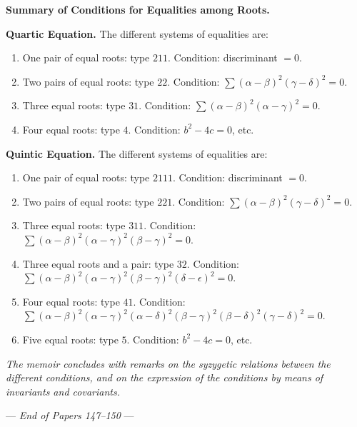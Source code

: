 \documentclass[11pt,a4paper]{article}
\begin{document}
\newpage
\begin{center}
\textbf{Summary of Conditions for Equalities among Roots.}
\end{center}

\textbf{Quartic Equation.} The different systems of equalities are:
\begin{enumerate}[label=(\roman*)]
\item One pair of equal roots: type $211$. Condition: discriminant $= 0$.
\item Two pairs of equal roots: type $22$. Condition:
  $\sum (\alpha - \beta)^2 (\gamma - \delta)^2 = 0$.
\item Three equal roots: type $31$. Condition:
  $\sum (\alpha - \beta)^2 (\alpha - \gamma)^2 = 0$.
\item Four equal roots: type $4$. Condition: $b^2 - 4c = 0$, etc.
\end{enumerate}

\textbf{Quintic Equation.} The different systems of equalities are:
\begin{enumerate}[label=(\roman*)]
\item One pair of equal roots: type $2111$. Condition: discriminant $= 0$.
\item Two pairs of equal roots: type $221$. Condition:
  $\sum (\alpha - \beta)^2 (\gamma - \delta)^2 = 0$.
\item Three equal roots: type $311$. Condition:
  $\sum (\alpha - \beta)^2 (\alpha - \gamma)^2 (\beta - \gamma)^2 = 0$.
\item Three equal roots and a pair: type $32$. Condition:
  $\sum (\alpha - \beta)^2 (\alpha - \gamma)^2 (\beta - \gamma)^2
   (\delta - \epsilon)^2 = 0$.
\item Four equal roots: type $41$. Condition:
  $\sum (\alpha - \beta)^2 (\alpha - \gamma)^2 (\alpha - \delta)^2
   (\beta - \gamma)^2 (\beta - \delta)^2 (\gamma - \delta)^2 = 0$.
\item Five equal roots: type $5$. Condition: $b^2 - 4c = 0$, etc.
\end{enumerate}

\textit{The memoir concludes with remarks on the syzygetic relations between
the different conditions, and on the expression of the conditions by means of
invariants and covariants.}

\vfill
\begin{center}
--- \textit{End of Papers 147--150} ---
\end{center}
\end{document}
